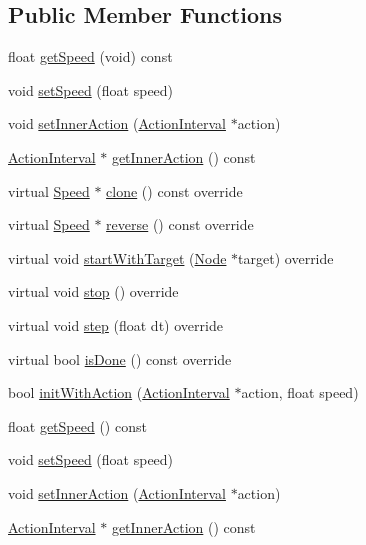 \subsection*{Public Member Functions}
\begin{DoxyCompactItemize}
\item 
float \hyperlink{classSpeed_a86aa1c63949b9bf1256b02915f8d6483}{get\+Speed} (void) const
\item 
void \hyperlink{classSpeed_ae2405e5be01d9c31ca97281088f70edf}{set\+Speed} (float speed)
\item 
void \hyperlink{classSpeed_abc885c86093d27f1c120ba094beb042d}{set\+Inner\+Action} (\hyperlink{classActionInterval}{Action\+Interval} $\ast$action)
\item 
\hyperlink{classActionInterval}{Action\+Interval} $\ast$ \hyperlink{classSpeed_a1b48ca1bbd76431c0ebe2d59f0075331}{get\+Inner\+Action} () const
\item 
virtual \hyperlink{classSpeed}{Speed} $\ast$ \hyperlink{classSpeed_a3c7ac785094cbc7bc3a5428e6464c9bc}{clone} () const override
\item 
virtual \hyperlink{classSpeed}{Speed} $\ast$ \hyperlink{classSpeed_a6662f73e93a1275be4655be85021f531}{reverse} () const override
\item 
virtual void \hyperlink{classSpeed_aba4c99e1a403b7966e03a05110c2647f}{start\+With\+Target} (\hyperlink{classNode}{Node} $\ast$target) override
\item 
virtual void \hyperlink{classSpeed_afc0df0c91cfcb119182fec7ccf470f45}{stop} () override
\item 
virtual void \hyperlink{classSpeed_a971cac28a44053f2011871529dac49a1}{step} (float dt) override
\item 
virtual bool \hyperlink{classSpeed_a6c357c4da932b6793c4626975546cb28}{is\+Done} () const override
\item 
bool \hyperlink{classSpeed_a4e2c8023a20b7093c9dd8f5b6838ef70}{init\+With\+Action} (\hyperlink{classActionInterval}{Action\+Interval} $\ast$action, float speed)
\item 
float \hyperlink{classSpeed_a865cd7267938f4847c355f9e37c058e8}{get\+Speed} () const
\item 
void \hyperlink{classSpeed_ae2405e5be01d9c31ca97281088f70edf}{set\+Speed} (float speed)
\item 
void \hyperlink{classSpeed_abc885c86093d27f1c120ba094beb042d}{set\+Inner\+Action} (\hyperlink{classActionInterval}{Action\+Interval} $\ast$action)
\item 
\hyperlink{classActionInterval}{Action\+Interval} $\ast$ \hyperlink{classSpeed_a1b48ca1bbd76431c0ebe2d59f0075331}{get\+Inner\+Action} () const

\end{DoxyCompactItemize}
